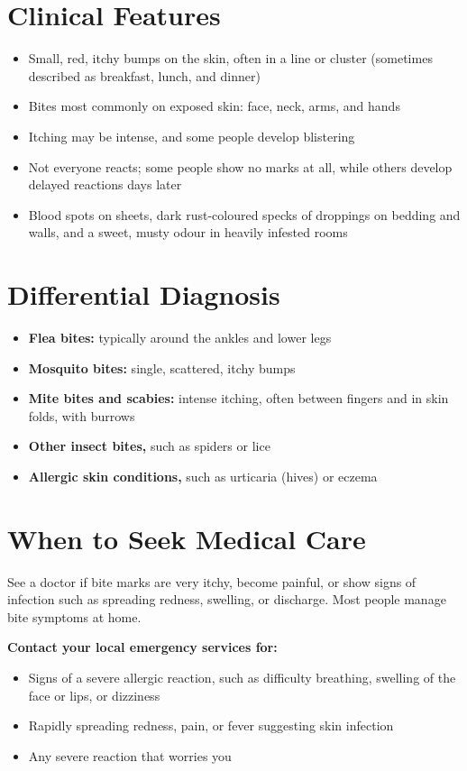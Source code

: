 \section*{Clinical Features}
\begin{itemize}
    \item Small, red, itchy bumps on the skin, often in a line or cluster (sometimes described as breakfast, lunch, and dinner)
    \item Bites most commonly on exposed skin: face, neck, arms, and hands
    \item Itching may be intense, and some people develop blistering
    \item Not everyone reacts; some people show no marks at all, while others develop delayed reactions days later
    \item Blood spots on sheets, dark rust-coloured specks of droppings on bedding and walls, and a sweet, musty odour in heavily infested rooms
\end{itemize}

\section*{Differential Diagnosis}
\begin{itemize}
    \item \textbf{Flea bites:} typically around the ankles and lower legs
    \item \textbf{Mosquito bites:} single, scattered, itchy bumps
    \item \textbf{Mite bites and scabies:} intense itching, often between fingers and in skin folds, with burrows
    \item \textbf{Other insect bites,} such as spiders or lice
    \item \textbf{Allergic skin conditions,} such as urticaria (hives) or eczema
\end{itemize}

\section*{When to Seek Medical Care}
See a doctor if bite marks are very itchy, become painful, or show signs of infection such as spreading redness, swelling, or discharge. Most people manage bite symptoms at home.

\textbf{Contact your local emergency services for:}
\begin{itemize}
    \item Signs of a severe allergic reaction, such as difficulty breathing, swelling of the face or lips, or dizziness
    \item Rapidly spreading redness, pain, or fever suggesting skin infection
    \item Any severe reaction that worries you
\end{itemize}

